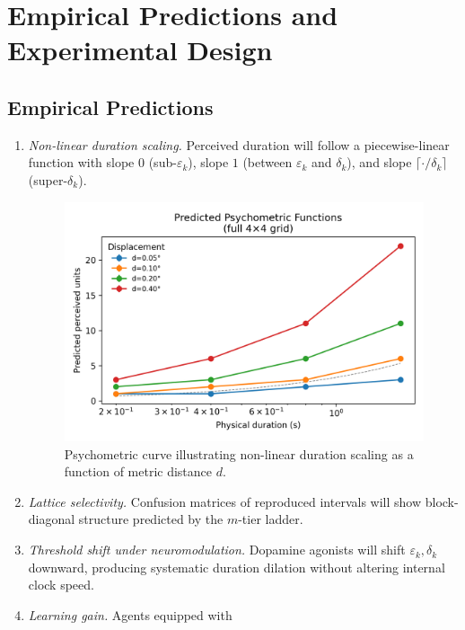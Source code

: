 \documentclass[preprint,11pt]{elsarticle}
\begin{document}
\section{Empirical Predictions and Experimental Design}

\subsection{Empirical Predictions}

\begin{enumerate}[label=\textbf{P\arabic*}]
    \item \label{pred:nonlinear} \emph{Non-linear duration scaling.}  Perceived
    duration will follow a piecewise-linear function with slope $0$
    (sub-$\varepsilon_k$), slope $1$ (between $\varepsilon_k$ and
    $\delta_k$), and slope $\lceil\cdot/\delta_k\rceil$ (super-$\delta_k$).
    \begin{figure}[ht]
      \centering
      \includegraphics[width=0.9\linewidth]{figures/psychometric_curve.png}
      \caption{Psychometric curve illustrating non-linear duration scaling as a function of metric distance \(d\).}
      \label{fig:psychometric_curve}
    \end{figure}
    \item \label{pred:lattice} \emph{Lattice selectivity.}  Confusion matrices of
    reproduced intervals will show block-diagonal structure predicted by the
    $m$-tier ladder.
    \item \label{pred:pharma} \emph{Threshold shift under neuromodulation.}
    Dopamine agonists will shift $\varepsilon_k,\delta_k$ downward, producing
    systematic duration dilation without altering internal clock speed.
    \item \label{pred:agent} \emph{Learning gain.}  Agents equipped with

\end{enumerate}
\end{document}
